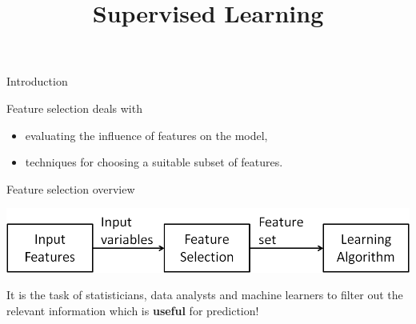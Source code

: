 \documentclass[11pt,compress,t,notes=noshow, xcolor=table]{beamer}
\title{Supervised Learning}
\date{}
\begin{document}

  \begin{vbframe}{Introduction}

    Feature selection deals with
    \begin{itemize}
      \item evaluating the influence of features on the model,
      \item techniques for choosing a suitable subset of features.
    \end{itemize}
  \end{vbframe}


  \begin{vbframe}{Feature selection overview}
    \begin{center}
    \includegraphics{figure_man/varsel_overview.png}
    \end{center}

    \lz

    It is the task of statisticians, data analysts and machine learners to filter out the relevant information which is \textbf{useful} for prediction!
  \end{vbframe}
\end{document}
